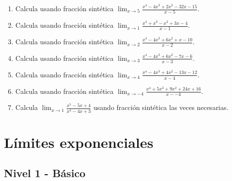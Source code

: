 \documentclass[11pt,a4paper]{article}
\begin{document}
\begin{enumerate}[label=\textbf{E\arabic*.},start=281]
\item Calcula usando fracción sintética $\displaystyle\lim_{x\to 5}\frac{x^4 - 4x^3 + 2x^2 - 32x - 15}{x-5}$. 

\item Calcula usando fracción sintética $\displaystyle\lim_{x\to 1}\frac{x^4 + x^3 - x^2 + 3x - 4}{x-1}$. 

\item Calcula usando fracción sintética $\displaystyle\lim_{x\to 2}\frac{x^4 - 4x^3 + 6x^2 + x - 10}{x-2}$. 

\item Calcula usando fracción sintética $\displaystyle\lim_{x\to 3}\frac{x^4 - 4x^3 + 6x^2 - 7x - 6}{x-3}$. 

\item Calcula usando fracción sintética $\displaystyle\lim_{x\to 4}\frac{x^4 - 4x^3 + 4x^2 - 13x - 12}{x-4}$. 

\item Calcula usando fracción sintética $\displaystyle\lim_{x\to -4}\frac{x^4 + 5x^3 + 9x^2 + 24x + 16}{x--4}$. 

\item Calcula $\displaystyle\lim_{x\to1}\frac{x^5-5x+4}{x^4-4x+3}$ usando fracción sintética las veces necesarias.

\end{enumerate}

\newpage

\section{Límites exponenciales}

\subsection{Nivel 1 - Básico}
\end{document}
